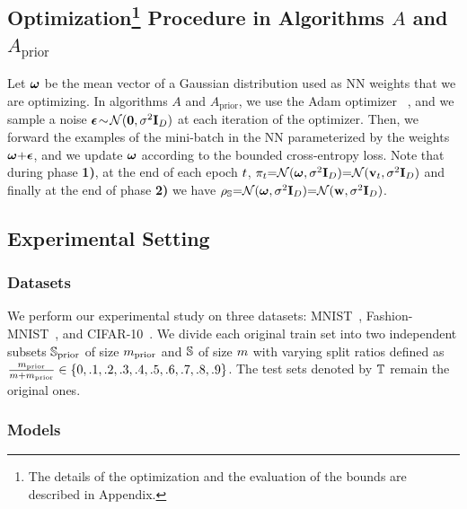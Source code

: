 \subsection[Optimization Procedure in Algorithms $A$ and $A_{\text{prior}}$]{Optimization\protect\footnote{The details of the optimization and the evaluation of the bounds are described in Appendix.} Procedure in Algorithms $A$ and $A_{\text{prior}}$}
Let $\omegabf$ be the mean vector of a Gaussian distribution used as NN weights that we are optimizing.
In algorithms $A$ and $A_{\text{prior}}$, we use the Adam optimizer ~\citep{KingmaBa2015}, and we sample a noise ${\epsilonbf}\!\sim\! \Ncal({\bf 0}, \sigma^2\Ibf_{D})$ at each iteration of the optimizer.
Then, we forward the examples of the mini-batch in the NN parameterized by the weights $\omegabf{+}\epsilonbf$, and we update $\omegabf$ according to the bounded cross-entropy loss. 
Note that during phase {\bf 1)}, at the end of each epoch $\t$, $\P_{\t} {=} \Ncal(\omegabf, \sigma^2\Ibf_{D}) {=} \Ncal(\vbf_\t, \sigma^2\Ibf_{D})$ and finally at the end of phase {\bf 2)} we have $\AQ {=} \Ncal(\omegabf, \sigma^2\Ibf_{D}) {=} \Ncal(\wbf, \sigma^2\Ibf_{D})$.

\subsection{Experimental Setting}

\subsubsection{Datasets}
We perform our experimental study on three datasets: MNIST~\citep{LeCunCortesBurges1998},  Fashion-MNIST~\citep{XiaoRasulVollgraf2017}, and  CIFAR-10~\citep{Krizhevsky2009}. 
We divide each original train set into two independent subsets $\S_{\text{prior}}$ of size $\m_{\text{prior}}$ and $\S$ of size $\m$ with varying split ratios defined as $\tfrac{\m_{\text{prior}}}{\m+\m_{\text{prior}}}\in\{0, .1, .2, .3, .4, .5, .6, .7, .8, .9\}$.
The test sets denoted by $\T$ remain the original ones.

\subsubsection{Models}
\label{chap:dis-pra:sec:models}

